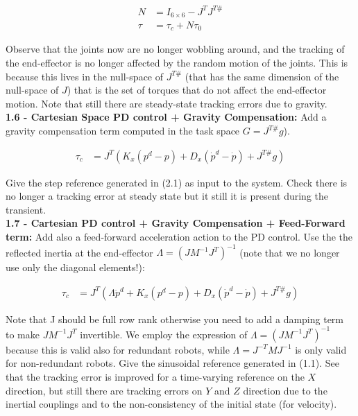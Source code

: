 \documentclass[11pt]{article}
\begin{document}
\begin{align}
N & = I_{6 \times 6} - J^T J^{T\#}\\
\tau& = \tau_c  + N\tau_0 
\end{align}

Observe that the joints now are no longer wobbling around, and the tracking of the end-effector is no longer affected by the random motion of the joints. 
This is because this lives in the null-space of $J^{T\#}$ (that has the same dimension of the null-space of $J$) that is the set of torques that do not affect the end-effector motion. Note that still there are steady-state tracking errors due to gravity.\\


\textbf{1.6 - Cartesian Space PD control + Gravity Compensation:}
Add a gravity compensation term computed in the task space $G= J^{T\#}g$).

\begin{align}
\tau_c & = J^T\left( K_x(p^d - p) + D_x(\dot{p}^d -\dot{p})  + J^{T\#}g \right)
\end{align}

Give the step reference generated in (2.1) as input to the system. 
Check there is no longer a  tracking error at steady state but  it still it is present during the transient. \\


\textbf{1.7 - Cartesian PD control  + Gravity Compensation + Feed-Forward term:}
Add also a feed-forward acceleration action to the PD control. Use the the reflected inertia
at the end-effector $\Lambda = (J M^{-1} J^T)^{-1}$ (note that we no longer use only the diagonal elements!):

\begin{align}
\tau_c & = J^T\left( \Lambda \ddot{p}^d + K_x(p^d - p) + D_x(\dot{p}^d -\dot{p})  + J^{T\#}g \right)
\end{align}

Note that J should be full row rank  otherwise you need to add a damping term to make $JM^{-1}J^T$ invertible.
We employ the expression of $\Lambda = (JM^{-1}J^T)^{-1}$ because this is valid also for redundant robots, while $\Lambda = J^{-T}M J^{-1}$ is only  valid for non-redundant robots. 
Give the sinusoidal reference generated in (1.1). See that the tracking error is improved for a time-varying reference on the $X$ direction, but still there are tracking errors on $Y$ and $Z$ direction due to the inertial couplings and to the non-consistency of the initial state (for velocity).\\
\end{document}
